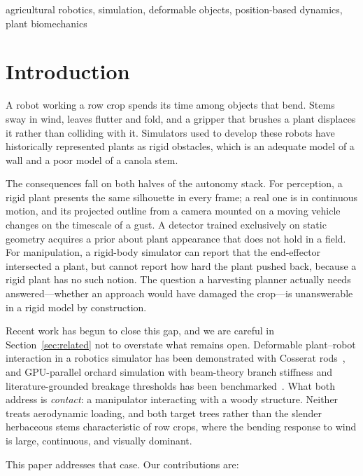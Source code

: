 \documentclass[conference]{IEEEtran}
\begin{document}
\begin{IEEEkeywords}
agricultural robotics, simulation, deformable objects, position-based
dynamics, plant biomechanics
\end{IEEEkeywords}

\section{Introduction}

A robot working a row crop spends its time among objects that bend. Stems sway
in wind, leaves flutter and fold, and a gripper that brushes a plant displaces
it rather than colliding with it. Simulators used to develop these robots have
historically represented plants as rigid obstacles, which is an adequate model
of a wall and a poor model of a canola stem.

The consequences fall on both halves of the autonomy stack. For perception, a
rigid plant presents the same silhouette in every frame; a real one is in
continuous motion, and its projected outline from a camera mounted on a moving
vehicle changes on the timescale of a gust. A detector trained exclusively on
static geometry acquires a prior about plant appearance that does not hold in
a field. For manipulation, a rigid-body simulator can report that the
end-effector intersected a plant, but cannot report how hard the plant pushed
back, because a rigid plant has no such notion. The question a harvesting
planner actually needs answered---whether an approach would have damaged the
crop---is unanswerable in a rigid model by construction.

Recent work has begun to close this gap, and we are careful in
Section~\ref{sec:related} not to overstate what remains open. Deformable
plant--robot interaction in a robotics simulator has been demonstrated with
Cosserat rods~\cite{deng2024gazeboplants}, and GPU-parallel orchard simulation
with beam-theory branch stiffness and literature-grounded breakage thresholds
has been benchmarked~\cite{munn2026orchardbench}. What both address is
\emph{contact}: a manipulator interacting with a woody structure. Neither
treats aerodynamic loading, and both target trees rather than the slender
herbaceous stems characteristic of row crops, where the bending response to
wind is large, continuous, and visually dominant.

This paper addresses that case. Our contributions are:
\end{document}
